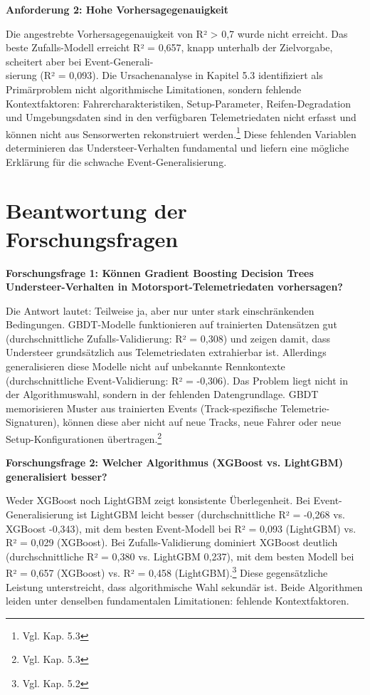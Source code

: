 \textbf{Anforderung 2: Hohe Vorhersagegenauigkeit}

Die angestrebte Vorhersagegenauigkeit von R² > 0,7 wurde nicht erreicht. Das beste Zufalls-Modell erreicht R² = 0,657, knapp unterhalb der Zielvorgabe, scheitert aber bei Event-Generali-\\sierung (R² = 0,093). Die Ursachenanalyse in Kapitel 5.3 identifiziert als Primärproblem nicht algorithmische Limitationen, sondern fehlende Kontextfaktoren: Fahrercharakteristiken, Setup-Parameter, Reifen-Degradation und Umgebungsdaten sind in den verfügbaren Telemetriedaten nicht erfasst und können nicht aus Sensorwerten rekonstruiert werden.\footnote{Vgl. Kap. 5.3} Diese fehlenden Variablen determinieren das Understeer-Verhalten fundamental und liefern eine mögliche Erklärung für die schwache Event-Generalisierung.



\section{Beantwortung der Forschungsfragen}

\textbf{Forschungsfrage 1: Können Gradient Boosting Decision Trees Understeer-Verhalten in Motorsport-Telemetriedaten vorhersagen?}

Die Antwort lautet: Teilweise ja, aber nur unter stark einschränkenden Bedingungen. GBDT-Modelle funktionieren auf trainierten Datensätzen gut (durchschnittliche Zufalls-Validierung: R² = 0,308) und zeigen damit, dass Understeer grundsätzlich aus Telemetriedaten extrahierbar ist. Allerdings generalisieren diese Modelle nicht auf unbekannte Rennkontexte (durchschnittliche Event-Validierung: R² = -0,306). Das Problem liegt nicht in der Algorithmuswahl, sondern in der fehlenden Datengrundlage. GBDT memorisieren Muster aus trainierten Events (Track-spezifische Telemetrie-Signaturen), können diese aber nicht auf neue Tracks, neue Fahrer oder neue Setup-Konfigurationen übertragen.\footnote{Vgl. Kap. 5.3}

\textbf{Forschungsfrage 2: Welcher Algorithmus (XGBoost vs. LightGBM) generalisiert besser?}

Weder XGBoost noch LightGBM zeigt konsistente Überlegenheit. Bei Event-Generalisierung ist LightGBM leicht besser (durchschnittliche R² = -0,268 vs. XGBoost -0,343), mit dem besten Event-Modell bei R² = 0,093 (LightGBM) vs. R² = 0,029 (XGBoost). Bei Zufalls-Validierung dominiert XGBoost deutlich (durchschnittliche R² = 0,380 vs. LightGBM 0,237), mit dem besten Modell bei R² = 0,657 (XGBoost) vs. R² = 0,458 (LightGBM).\footnote{Vgl. Kap. 5.2} Diese gegensätzliche Leistung unterstreicht, dass algorithmische Wahl sekundär ist. Beide Algorithmen leiden unter denselben fundamentalen Limitationen: fehlende Kontextfaktoren.

